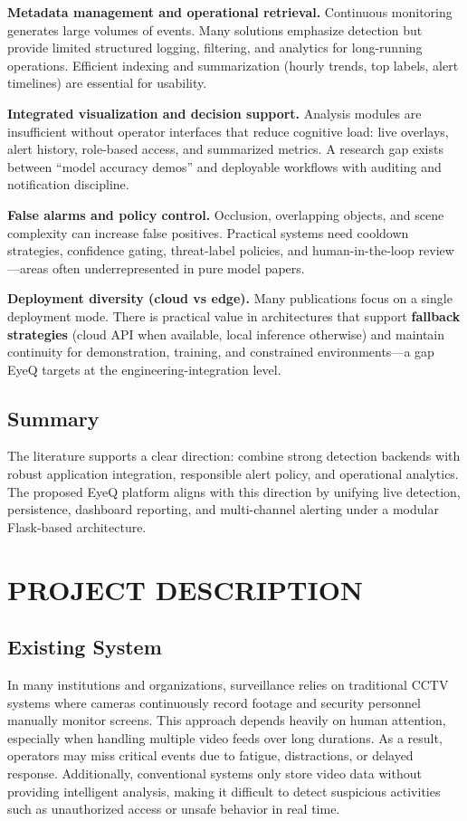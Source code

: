 \documentclass[10pt,openany]{report}
\begin{document}
\begin{sloppypar}
{{{\begin{sloppypar}
\textbf{Metadata management and operational retrieval.} Continuous monitoring generates large volumes of events. Many solutions emphasize detection but provide limited structured logging, filtering, and analytics for long-running operations. Efficient indexing and summarization (hourly trends, top labels, alert timelines) are essential for usability.

\textbf{Integrated visualization and decision support.} Analysis modules are insufficient without operator interfaces that reduce cognitive load: live overlays, alert history, role-based access, and summarized metrics. A research gap exists between ``model accuracy demos'' and deployable workflows with auditing and notification discipline.

\textbf{False alarms and policy control.} Occlusion, overlapping objects, and scene complexity can increase false positives. Practical systems need cooldown strategies, confidence gating, threat-label policies, and human-in-the-loop review---areas often underrepresented in pure model papers.

\textbf{Deployment diversity (cloud vs edge).} Many publications focus on a single deployment mode. There is practical value in architectures that support \textbf{fallback strategies} (cloud API when available, local inference otherwise) and maintain continuity for demonstration, training, and constrained environments---a gap EyeQ targets at the engineering-integration level.

\section*{Summary}
The literature supports a clear direction: combine strong detection backends with robust application integration, responsible alert policy, and operational analytics. The proposed EyeQ platform aligns with this direction by unifying live detection, persistence, dashboard reporting, and multi-channel alerting under a modular Flask-based architecture.
\linespread{1.5}
\newpage
\chapter{PROJECT DESCRIPTION}
\linespread{1.5}

\section{Existing System}

In many institutions and organizations, surveillance relies on traditional CCTV systems where cameras continuously record footage and security personnel manually monitor screens. This approach depends heavily on human attention, especially when handling multiple video feeds over long durations. As a result, operators may miss critical events due to fatigue, distractions, or delayed response. Additionally, conventional systems only store video data without providing intelligent analysis, making it difficult to detect suspicious activities such as unauthorized access or unsafe behavior in real time.


\end{sloppypar}}}}
\end{sloppypar}
\end{document}
